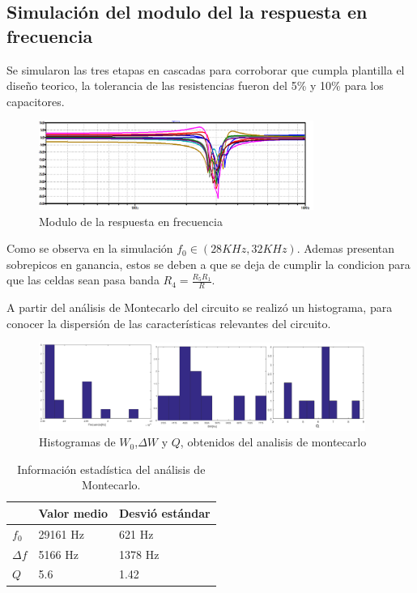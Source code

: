 \documentclass[../../tc_tp5_main.tex]{subfiles}
\begin{document}
\subsection{Simulación del modulo del la respuesta en frecuencia}
Se simularon las tres etapas en cascadas para corroborar que cumpla plantilla el diseño teorico, la tolerancia de las resistencias fueron del 5\% y 10\% para los capacitores.
\begin{figure}[H]	
	\centering
	\includegraphics[width=0.8\textwidth]{imagenes/montecarlo.png}
	\caption{Modulo de la respuesta en frecuencia}
\end{figure}
Como se observa en la simulación $f_0\in (28KHz,32KHz)$. Ademas presentan sobrepicos en ganancia, estos se deben a que se deja de cumplir la condicion para que las celdas sean pasa banda $R_4=\frac{R_5 R_1}{R}$.

A partir del análisis de Montecarlo del circuito se realizó un histograma, para conocer la dispersión de las características relevantes del circuito.

\begin{figure}[H]	
	\centering
	\includegraphics[width=0.95\textwidth]{imagenes/hist.png}
	\caption{Histogramas de $W_0$,$\Delta W$ y $Q$, obtenidos del analisis de montecarlo}
\end{figure}

\begin{table}[H]
\begin{center}
\begin{tabular}{|l|l|l|}
\hline
 &Valor medio &Desvió estándar\\
\hline \hline

$ f_0$ &29161 Hz &621 Hz  \\ \hline
$\Delta f$ & 5166 Hz&1378 Hz  \\ \hline
$Q$ &5.6 &1.42  \\ \hline

\end{tabular}
\caption{Información estadística del análisis de Montecarlo.} 
\end{center}
\end{table}
\end{document}

